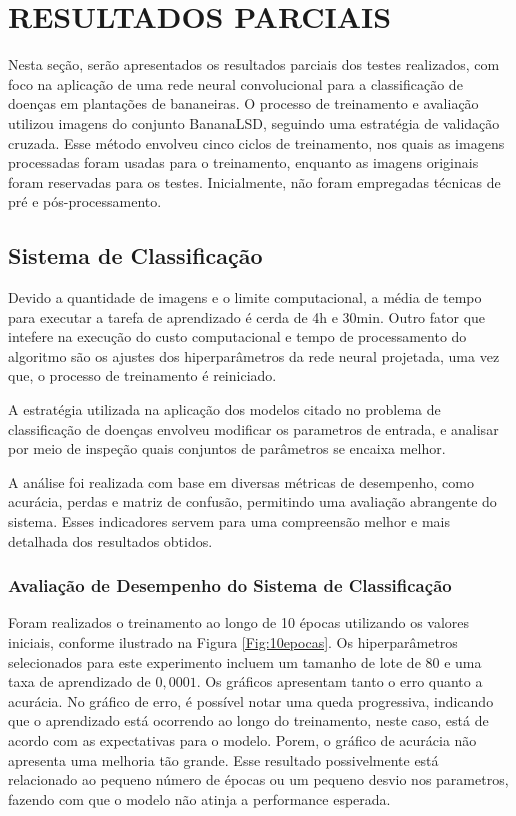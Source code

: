 \chapter{RESULTADOS PARCIAIS}{}
\label{cap:05}
Nesta seção, serão apresentados os resultados parciais dos testes realizados, com foco na aplicação de uma rede neural convolucional para a classificação de doenças em plantações de bananeiras. O processo de treinamento e avaliação utilizou imagens do conjunto \ac{BananaLSD}, seguindo uma estratégia de validação cruzada. Esse método envolveu cinco ciclos de treinamento, nos quais as imagens processadas foram usadas para o treinamento, enquanto as imagens originais foram reservadas para os testes. Inicialmente, não foram empregadas técnicas de pré e pós-processamento.


\section{Sistema de Classificação}
Devido a quantidade de imagens e o limite computacional, a média de tempo para executar a tarefa de aprendizado é cerda de 4h e 30min. Outro fator que intefere na execução do custo computacional e tempo de processamento do algoritmo são os ajustes dos hiperparâmetros da rede neural projetada, uma vez que, o processo de treinamento é reiniciado.   

A estratégia utilizada na aplicação dos modelos citado no problema de classificação de doenças envolveu modificar os parametros de entrada, e analisar por meio de inspeção quais conjuntos de parâmetros se encaixa melhor.

A análise foi realizada com base em diversas métricas de desempenho, como acurácia, perdas e matriz de confusão, permitindo uma avaliação abrangente do sistema. Esses indicadores servem para uma compreensão melhor e mais detalhada dos resultados obtidos. 

\subsection{Avaliação de Desempenho do Sistema de Classificação}
Foram realizados  o treinamento ao longo de 10 épocas utilizando os valores iniciais, conforme ilustrado na Figura \ref{Fig:10epocas}. Os hiperparâmetros selecionados para este experimento incluem um tamanho de lote de 80 e uma taxa de aprendizado de $0,0001$. Os  gráficos apresentam tanto o erro quanto a acurácia. No gráfico de erro, é possível notar uma queda progressiva, indicando que o aprendizado está ocorrendo ao longo do treinamento, neste caso, está de acordo com as expectativas para o modelo. Porem, o gráfico de acurácia não apresenta uma melhoria tão grande. Esse resultado possivelmente está relacionado ao pequeno número de épocas ou um pequeno desvio nos parametros, fazendo com que o modelo não atinja a performance esperada. 

